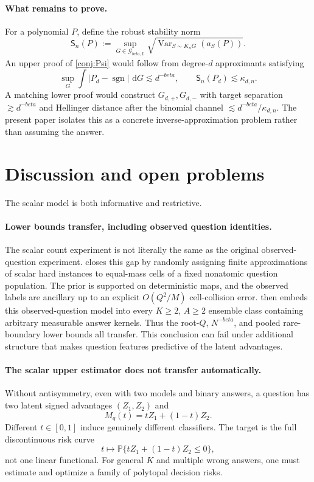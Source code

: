 \documentclass[11pt]{article}
\def\beta{beta}%
\newcommand{\Pp}{\mathbb P}
\newcommand{\sgn}{\operatorname{sgn}}
\newcommand{\Var}{\operatorname{Var}}
\newcommand{\calG}{\mathcal G}
\newcommand{\dd}{\,\mathrm d}
\begin{document}
\paragraph{What remains to prove.}
For a polynomial $P$, define the robust stability norm
\[
\mathsf S_n(P)
:=
\sup_{G\in\calG_{\beta,L}}
\sqrt{\Var_{S\sim K_nG}(a_S(P))}.
\]
An upper proof of \cref{conj:Psi} would follow from degree-$d$ approximants satisfying
\[
\sup_G\int|P_d-\sgn|\,\dd G\lesssim d^{-\beta},
\qquad
\mathsf S_n(P_d)\lesssim\kappa_{d,n}.
\]
A matching lower proof would construct $G_{d,+},G_{d,-}$ with target separation $\gtrsim d^{-\beta}$ and Hellinger distance after the binomial channel $\lesssim d^{-\beta}/\kappa_{d,n}$.  The present paper isolates this as a concrete inverse-approximation problem rather than assuming the answer.

\section{Discussion and open problems}
\label{sec:back-general}

The scalar model is both informative and restrictive.

\paragraph{Lower bounds transfer, including observed question identities.}
The scalar count experiment is not literally the same as the original observed-question experiment.   closes this gap by randomly assigning finite approximations of scalar hard instances to equal-mass cells of a fixed nonatomic question population.  The prior is supported on deterministic maps, and the observed labels are ancillary up to an explicit $O(Q^2/M)$ cell-collision error.   then embeds this observed-question model into every $K\ge2$, $A\ge2$ ensemble class containing arbitrary measurable answer kernels.  Thus the root-$Q$, $N^{-\beta}$, and pooled rare-boundary lower bounds all transfer.  This conclusion can fail under additional structure that makes question features predictive of the latent advantages.

\paragraph{The scalar upper estimator does not transfer automatically.}
Without antisymmetry, even with two models and binary answers, a question has two latent signed advantages $(Z_1,Z_2)$ and
\[
M_q(t)=tZ_1+(1-t)Z_2.
\]
Different $t\in[0,1]$ induce genuinely different classifiers.  The target is the full discontinuous risk curve
\[
t\mapsto \Pp\{tZ_1+(1-t)Z_2\le0\},
\]
not one linear functional.  For general $K$ and multiple wrong answers, one must estimate and optimize a family of polytopal decision risks.
\end{document}
